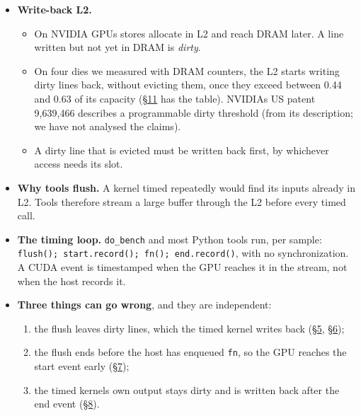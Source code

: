 \documentclass[11pt,a4paper]{article}
\providecommand{\tightlist}{\setlength{\itemsep}{0pt}\setlength{\parskip}{0pt}}
\begin{document}
\begin{itemize}
\tightlist
\item
  \textbf{Write-back L2.}

  \begin{itemize}
  \tightlist
  \item
    On NVIDIA GPUs stores allocate in L2 and reach DRAM later. A line written but not yet in DRAM is \emph{dirty}.
  \item
    On four dies we measured with DRAM counters, the L2 starts writing dirty lines back, without evicting them,
    once they exceed between 0.44 and 0.63 of its capacity (\hyperref[measurement-pitfall-per-kernel-dram-write-counters-lose-bytes]{\S{}11} has the table). NVIDIA\textquotesingle s US patent 9,639,466
    describes a programmable dirty threshold (from its description; we have not analysed the claims).
  \item
    A dirty line that is evicted must be written back first, by whichever access needs its slot.
  \end{itemize}
\item
  \textbf{Why tools flush.} A kernel timed repeatedly would find its inputs already in L2. Tools therefore stream a
  large buffer through the L2 before every timed call.
\item
  \textbf{The timing loop.} \texttt{do\_\allowbreak{}bench} and most Python tools run, per sample:
  \texttt{flush();\ start.record();\ fn();\ end.record()}, with no synchronization. A CUDA event is timestamped when the
  GPU reaches it in the stream, not when the host records it.
\item
  \textbf{Three things can go wrong}, and they are independent:

  \begin{enumerate}
  \def\labelenumi{\arabic{enumi}.}
  \tightlist
  \item
    the flush leaves dirty lines, which the timed kernel writes back (\hyperref[how-big-is-the-bias-nine-gpus]{\S{}5}, \hyperref[what-removes-the-residue-and-what-does-not]{\S{}6});
  \item
    the flush ends before the host has enqueued \texttt{fn}, so the GPU reaches the start event early (\hyperref[pitfall-2-queue-drain]{\S{}7});
  \item
    the timed kernel\textquotesingle s own output stays dirty and is written back after the end event (\hyperref[pitfall-3-who-pays-for-a-kernels-own-writes]{\S{}8}).
  \end{enumerate}
\end{itemize}
\end{document}
